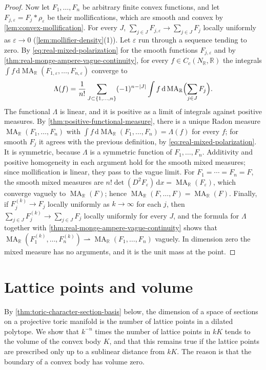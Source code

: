 \begin{proof}
Now let $F_1,\ldots,F_n$ be arbitrary finite convex functions, and let $F_{j,\varepsilon}=F_j*\rho_\varepsilon$ be their mollifications, which are smooth and convex by \cref{lem:convex-mollification}. For every $J$, $\sum_{j\in J}F_{j,\varepsilon}\to\sum_{j\in J}F_j$ locally uniformly as $\varepsilon\to0$ (\cref{lem:mollifier-density}(1)). Let $\varepsilon$ run through a sequence tending to zero. By \eqref{eq:real-mixed-polarization} for the smooth functions $F_{j,\varepsilon}$ and by \cref{thm:real-monge-ampere-vague-continuity}, for every $f\in C_c(N_{\mathbb R},\mathbb R)$ the integrals $\int f\,\mathrm d\operatorname{MA}_{\mathbb R}(F_{1,\varepsilon},\ldots,F_{n,\varepsilon})$ converge to
\[
 \Lambda(f)=\frac1{n!}\sum_{J\subset\{1,\ldots,n\}}(-1)^{n-|J|}\int f\,\mathrm d\operatorname{MA}_{\mathbb R}\Bigl(\sum_{j\in J}F_j\Bigr).
\]
The functional $\Lambda$ is linear, and it is positive as a limit of integrals against positive measures. By \cref{thm:positive-functional-measure}, there is a unique Radon measure $\operatorname{MA}_{\mathbb R}(F_1,\ldots,F_n)$ with $\int f\,\mathrm d\operatorname{MA}_{\mathbb R}(F_1,\ldots,F_n)=\Lambda(f)$ for every $f$; for smooth $F_j$ it agrees with the previous definition, by \eqref{eq:real-mixed-polarization}. It is symmetric, because $\Lambda$ is a symmetric function of $F_1,\ldots,F_n$. Additivity and positive homogeneity in each argument hold for the smooth mixed measures; since mollification is linear, they pass to the vague limit. For $F_1=\cdots=F_n=F$, the smooth mixed measures are $n!\det(D^2F_\varepsilon)\,\mathrm dx=\operatorname{MA}_{\mathbb R}(F_\varepsilon)$, which converge vaguely to $\operatorname{MA}_{\mathbb R}(F)$; hence $\operatorname{MA}_{\mathbb R}(F,\ldots,F)=\operatorname{MA}_{\mathbb R}(F)$. Finally, if $F_j^{(k)}\to F_j$ locally uniformly as $k\to\infty$ for each $j$, then $\sum_{j\in J}F_j^{(k)}\to\sum_{j\in J}F_j$ locally uniformly for every $J$, and the formula for $\Lambda$ together with \cref{thm:real-monge-ampere-vague-continuity} shows that $\operatorname{MA}_{\mathbb R}(F_1^{(k)},\ldots,F_n^{(k)})\rightharpoonup\operatorname{MA}_{\mathbb R}(F_1,\ldots,F_n)$ vaguely. In dimension zero the mixed measure has no arguments, and it is the unit mass at the point.
\end{proof}



\section{Lattice points and volume}
\label{sec:lattice-points-and-volume}
By \cref{thm:toric-character-section-basis} below, the dimension of a space of sections on a projective toric manifold is the number of lattice points in a dilated polytope. We show that $k^{-n}$ times the number of lattice points in $kK$ tends to the volume of the convex body $K$, and that this remains true if the lattice points are prescribed only up to a sublinear distance from $kK$. The reason is that the boundary of a convex body has volume zero.

